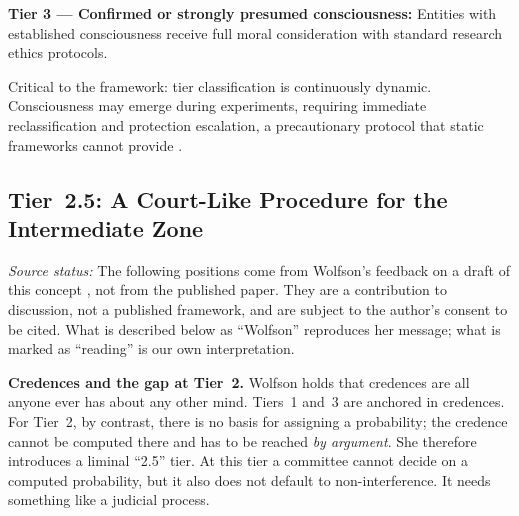 \documentclass[acmlarge, nonacm]{acmart}
\begin{document}
\textbf{Tier 3 --- Confirmed or strongly presumed consciousness:} Entities with established consciousness receive full moral consideration with standard research ethics protocols.

Critical to the framework: tier classification is continuously dynamic. Consciousness may emerge during experiments, requiring immediate reclassification and protection escalation, a precautionary protocol that static frameworks cannot provide \cite{wolfson2026}.

\subsection{Tier~2.5: A Court-Like Procedure for the Intermediate Zone}

\textit{Source status:} The following positions come from Wolfson's feedback on a draft of this concept \cite{wolfson2026pc}, not from the published paper. They are a contribution to discussion, not a published framework, and are subject to the author's consent to be cited. What is described below as ``Wolfson'' reproduces her message; what is marked as ``reading'' is our own interpretation.

\textbf{Credences and the gap at Tier~2.} Wolfson holds that credences are all anyone ever has about any other mind. Tiers~1 and~3 are anchored in credences. For Tier~2, by contrast, there is no basis for assigning a probability; the credence cannot be computed there and has to be reached \textit{by argument}. She therefore introduces a liminal ``2.5'' tier. At this tier a committee cannot decide on a computed probability, but it also does not default to non-interference. It needs something like a judicial process.
\end{document}
